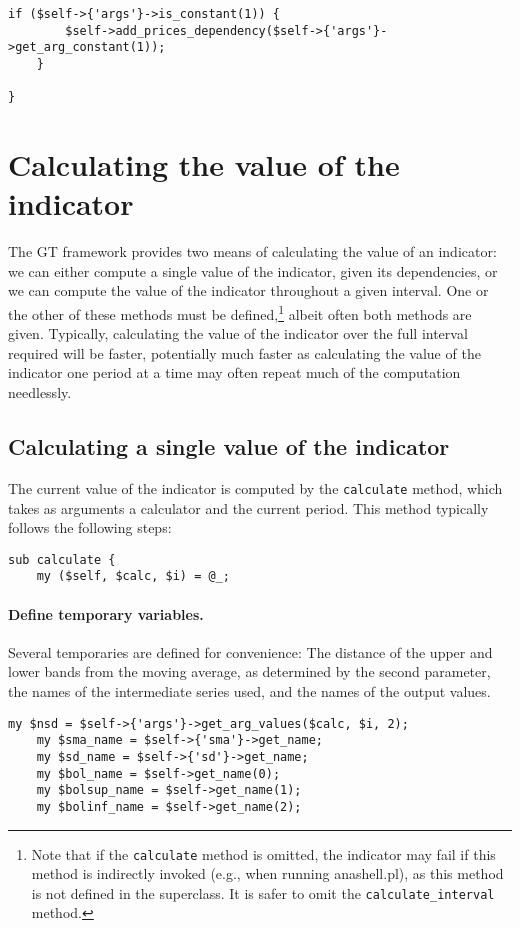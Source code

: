 \documentclass[11pt,twoside]{article}
\begin{document}
\begin{lstlisting}[name=example]
    if ($self->{'args'}->is_constant(1)) {
        $self->add_prices_dependency($self->{'args'}->get_arg_constant(1));
    }

}
\end{lstlisting}
\section{Calculating the value of the indicator}
The GT framework provides two means of calculating the value of an
indicator: we can either compute a single value of the indicator, given
its dependencies, or we can compute the value of the indicator
throughout a given interval. One or the other of these methods must be
defined,\footnote{Note that if the \lstinline!calculate!
method is omitted, the indicator may fail if this method is indirectly
invoked (e.g., when running anashell.pl), as this method is not defined
in the superclass. It is safer to omit the
\lstinline!calculate_interval! method.} albeit often both
methods are given. Typically, calculating the value of the indicator
over the full interval required will be faster, potentially much faster
as calculating the value of the indicator one period at a time may
often repeat much of the computation needlessly.


\subsection{Calculating a single value of the indicator}
The current value of the indicator is computed by the
\lstinline!calculate! method, which takes as arguments a
calculator and the current period. This method typically follows the
following steps:

\begin{lstlisting}[name=example]
sub calculate {
    my ($self, $calc, $i) = @_;
\end{lstlisting}

\paragraph{Define temporary variables.}

Several temporaries are defined for convenience: The distance of the
upper and lower bands from the moving average, as determined by the
second parameter, the names of the intermediate series used, and the
names of the output values.

\begin{lstlisting}[name=example]
    my $nsd = $self->{'args'}->get_arg_values($calc, $i, 2);
    my $sma_name = $self->{'sma'}->get_name;
    my $sd_name = $self->{'sd'}->get_name;
    my $bol_name = $self->get_name(0);
    my $bolsup_name = $self->get_name(1);
    my $bolinf_name = $self->get_name(2);

\end{lstlisting}
\end{document}
